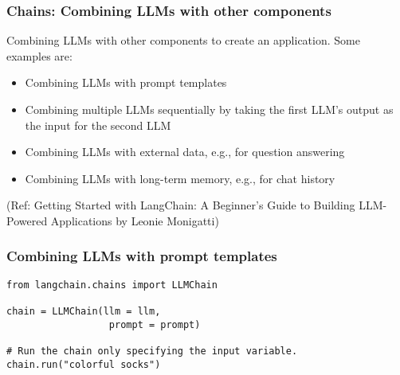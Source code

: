 \begin{frame}[fragile]\frametitle{Chains: Combining LLMs with other components}

Combining LLMs with other components to create an application. Some examples are:


\begin{itemize}
\item Combining LLMs with prompt templates 
\item Combining multiple LLMs sequentially by taking the first LLM’s output as the input for the second LLM 
\item Combining LLMs with external data, e.g., for question answering 
\item Combining LLMs with long-term memory, e.g., for chat history
\end{itemize}

{\tiny (Ref: Getting Started with LangChain: A Beginner’s Guide to Building LLM-Powered Applications by Leonie Monigatti)}

\end{frame}

\begin{frame}[fragile]\frametitle{Combining LLMs with prompt templates}



\begin{lstlisting}
from langchain.chains import LLMChain

chain = LLMChain(llm = llm, 
                  prompt = prompt)

# Run the chain only specifying the input variable.
chain.run("colorful socks")
\end{lstlisting}


\end{frame}

